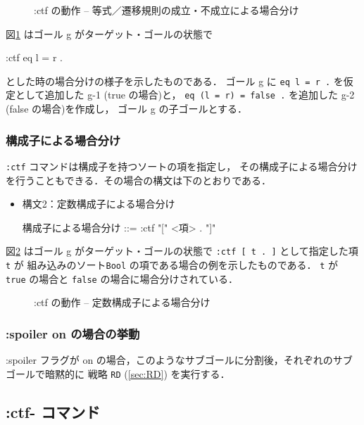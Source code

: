 \documentclass[a4paper,oneside,10pt,here]{memoir}
\newenvironment{vvtm}%
{\parskip=0pt\lineskip=0pt\begin{center}\begin{minipage}{0.8\textwidth}\begin{snugshade}}%
  {\end{snugshade}\end{minipage}\end{center}}
\begin{document}
\begin{figure}[hbt]
  \centering
  
  \caption{:ctf の動作 -- 等式／遷移規則の成立・不成立による場合分け}
  \label{fig:ctf}
\end{figure}
図\ref{fig:ctf} はゴール g がターゲット・ゴールの状態で
  \begin{simplev}
    :ctf {eq l = r . }
  \end{simplev}
とした時の場合分けの様子を示したものである．
ゴール g に \texttt{eq l = r .} を仮定として追加した g-1 (true の場合)と，
  \texttt{eq (l = r) = false .} を追加した g-2 (false の場合)を作成し，
  ゴール g の子ゴールとする．

\subsubsection{構成子による場合分け}
\texttt{:ctf} コマンドは構成子を持つソートの項を指定し，
その構成子による場合分けを行うこともできる．その場合の構文は下のとおりである．
\begin{itemize}
\item 構文2：定数構成子による場合分け
  \begin{vvtm}
    \begin{simplev}
      構成子による場合分け ::= :ctf "[" <項> . "]"
    \end{simplev}
  \end{vvtm}
\end{itemize}
図\ref{fig:ctf2} はゴール g がターゲット・ゴールの状態で
 \texttt{:ctf [ t . ]} として指定した項 \texttt{t} が
組み込みのソート\texttt{Bool} の項である場合の例を示したものである．
\texttt{t} が \texttt{true} の場合と \texttt{false} の場合に場合分けされている．
\begin{figure}[hbt]
  \centering
  
  \caption{:ctf の動作 -- 定数構成子による場合分け}
  \label{fig:ctf2}
\end{figure}


\subsubsection{:spoiler on の場合の挙動}
:spoiler フラグが on の場合，このようなサブゴールに分割後，それぞれのサブゴールで暗黙的に
戦略 \texttt{RD} (\ref{sec:RD}) を実行する．

\subsection{:ctf- コマンド}\label{sec:ctf-}
\end{document}
